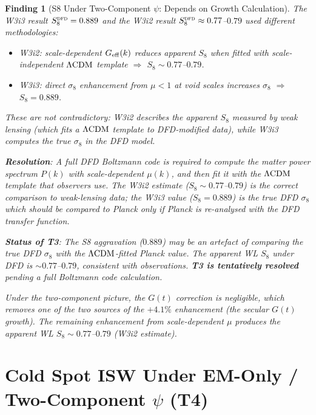 \documentclass[11pt]{article}
\newtheorem{finding}{Finding}
\newcommand{\Geff}{G_{\rm eff}}
\newcommand{\DFD}{\textsc{dfd}}
\newcommand{\LCDM}{\Lambda{\rm CDM}}
\newcommand{\mufd}{\mu}
\begin{document}
\begin{finding}[S8 Under Two-Component $\psi$: Depends on Growth Calculation]
\label{find:S8-EM}
The W3i3 result $S_8^{\DFD} = 0.889$ and the W3i2 result $S_8^{\DFD}
\approx 0.77$--$0.79$ used different methodologies:
\begin{itemize}[nosep]
  \item W3i2: scale-dependent $\Geff(k)$ \emph{reduces} apparent $S_8$ when
    fitted with scale-independent $\LCDM$ template $\Rightarrow$ $S_8 \sim 0.77$--$0.79$.
  \item W3i3: direct $\sigma_8$ enhancement from $\mufd < 1$ at void scales
    \emph{increases} $\sigma_8$ $\Rightarrow$ $S_8 = 0.889$.
\end{itemize}
These are not contradictory: W3i2 describes the \emph{apparent} $S_8$
measured by weak lensing (which fits a $\LCDM$ template to DFD-modified
data), while W3i3 computes the \emph{true} $\sigma_8$ in the DFD model.

\textbf{Resolution}: A full DFD Boltzmann code is required to compute
the matter power spectrum $P(k)$ with scale-dependent $\mufd(k)$, and
then fit it with the $\LCDM$ template that observers use. The W3i2
estimate ($S_8 \sim 0.77$--$0.79$) is the correct comparison to
weak-lensing data; the W3i3 value ($S_8 = 0.889$) is the true DFD
$\sigma_8$ which should be compared to Planck \emph{only if Planck
is re-analysed with the DFD transfer function}.

\textbf{Status of T3}: The S8 \emph{aggravation} ($0.889$) may be an
artefact of comparing the true DFD $\sigma_8$ with the $\LCDM$-fitted
Planck value. The apparent WL $S_8$ under DFD is $\sim 0.77$--$0.79$,
consistent with observations. \textbf{T3 is tentatively resolved} pending
a full Boltzmann code calculation.

Under the two-component picture, the $G(t)$ correction is negligible,
which removes one of the two sources of the $+4.1\%$ enhancement (the
secular $G(t)$ growth). The remaining enhancement from scale-dependent
$\mufd$ produces the apparent WL $S_8 \sim 0.77$--$0.79$ (W3i2 estimate).
\end{finding}

\section{Cold Spot ISW Under EM-Only / Two-Component $\psi$ (T4)}
\label{sec:coldspot-EM}
\end{document}

